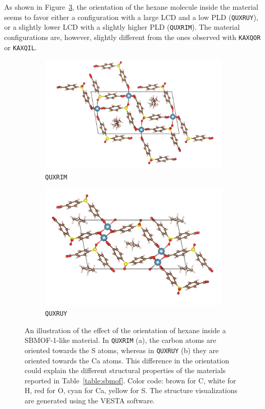 \documentclass[main]{subfiles}
\begin{document}
As shown in Figure~\ref{fgr:ads_config}, the orientation of the hexane molecule inside the material seems to favor either a configuration with a large LCD and a low PLD (\texttt{QUXRUY}), or a slightly lower LCD with a slightly higher PLD (\texttt{QUXRIM}). The material configurations are, however, slightly different from the ones observed with \texttt{KAXQOR} or \texttt{KAXQIL}. 

\begin{figure}[ht]
  \centering
  \begin{subfigure}[b]{0.45\textwidth}
    \centering
    \includegraphics[height=0.6\textwidth]{figures/6-perspectives/QUXRIM.jpg}
    \caption{\texttt{QUXRIM}}\label{fgr:QUXRIM}
  \end{subfigure}
  \hfill
  \begin{subfigure}[b]{0.45\textwidth}
    \centering
    \includegraphics[height=0.6\textwidth]{figures/6-perspectives/QUXRUY.jpg}
    \caption{\texttt{QUXRUY}}\label{fgr:QUXRUY}
  \end{subfigure}
  \caption{ An illustration of the effect of the orientation of hexane inside a SBMOF-1-like material. In \texttt{QUXRIM} (a), the carbon atoms are oriented towards the S atoms, whereas in \texttt{QUXRUY} (b) they are oriented towards the Ca atoms. This difference in the orientation could explain the different structural properties of the materials reported in Table~\ref{table:sbmof}. Color code: brown for C, white for H, red for O, cyan for Ca, yellow for S. The structure visualizations are generated using the VESTA software.\autocite{VESTA}}\label{fgr:ads_config}
\end{figure}
\end{document}
